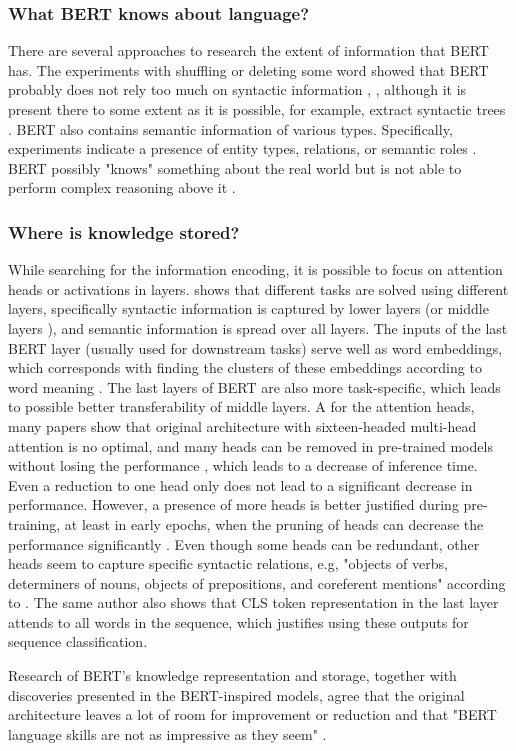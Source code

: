 \subsubsection{What BERT knows about language?}
There are several approaches to research the extent of information that BERT has. The experiments with shuffling or deleting some word showed that BERT probably does not rely too much on syntactic information \citep{Ettinger2019}, \citep{Rogers2020}, although it is present there to some extent as it is possible, for example, extract syntactic trees \citep{Rosa2019}. BERT also contains semantic information of various types. Specifically, experiments indicate a presence of entity types, relations, or semantic roles \citep{Tenney2019a}. BERT possibly "knows" something about the real world but is not able to perform complex reasoning above it \citep{Rogers2020}.

\subsubsection{Where is knowledge stored?}
While searching for the information encoding, it is possible to focus on attention heads or activations in layers.
\citep{Tenney2019} shows that different tasks are solved using different layers, specifically syntactic information is captured by lower layers (or middle layers \citep{Rogers2020}), and semantic information is spread over all layers. The inputs of the last BERT layer (usually used for downstream tasks) serve well as word embeddings, which corresponds with finding the clusters of these embeddings according to word meaning \citep{Rogers2020}. The last layers of BERT are also more task-specific, which leads to possible better transferability of middle layers. A for the attention heads, many papers show that original architecture with sixteen-headed multi-head attention is no optimal, and many heads can be removed in pre-trained models without losing the performance \citep{Michel2019}, which leads to a decrease of inference time. Even a reduction to one head only does not lead to a significant decrease in performance. However, a presence of more heads is better justified during pre-training, at least in early epochs, when the pruning of heads can decrease the performance significantly \citep{Michel2019}. Even though some heads can be redundant, other heads seem to capture specific syntactic relations, e.g, "objects of verbs, determiners of nouns, objects of prepositions, and coreferent mentions" according to \citep{Clark2019}. The same author also shows that CLS token representation in the last layer attends to all words in the sequence, which justifies using these outputs for sequence classification. 
\par
Research of BERT's knowledge representation and storage, together with discoveries presented in the BERT-inspired models, agree that the original architecture leaves a lot of room for improvement or reduction and that "BERT language skills are not as impressive as they seem" \citep{Rogers2020}.

